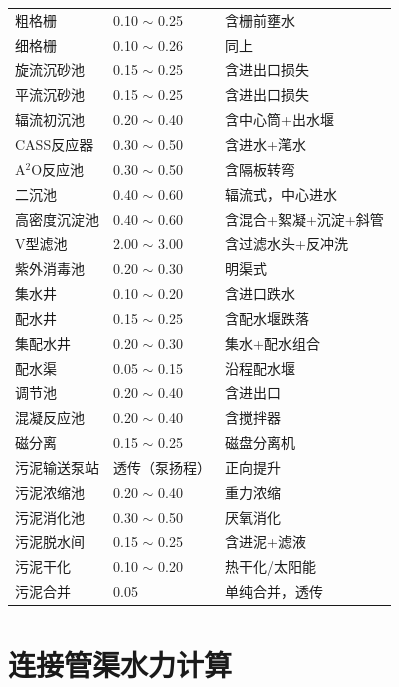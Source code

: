 \documentclass[12pt,a4paper]{ctexart}
\begin{document}
\begin{longtable}{@{}lll@{}}
粗格栅          & 0.10 $\sim$ 0.25  & 含栅前壅水 \\
细格栅          & 0.10 $\sim$ 0.26  & 同上 \\
旋流沉砂池      & 0.15 $\sim$ 0.25  & 含进出口损失 \\
平流沉砂池      & 0.15 $\sim$ 0.25  & 含进出口损失 \\
辐流初沉池      & 0.20 $\sim$ 0.40  & 含中心筒+出水堰 \\
CASS反应器      & 0.30 $\sim$ 0.50  & 含进水+滗水 \\
A$^2$O反应池    & 0.30 $\sim$ 0.50  & 含隔板转弯 \\
二沉池          & 0.40 $\sim$ 0.60  & 辐流式，中心进水 \\
高密度沉淀池    & 0.40 $\sim$ 0.60  & 含混合+絮凝+沉淀+斜管 \\
V型滤池         & 2.00 $\sim$ 3.00  & 含过滤水头+反冲洗 \\
紫外消毒池      & 0.20 $\sim$ 0.30  & 明渠式 \\
集水井          & 0.10 $\sim$ 0.20  & 含进口跌水 \\
配水井          & 0.15 $\sim$ 0.25  & 含配水堰跌落 \\
集配水井        & 0.20 $\sim$ 0.30  & 集水+配水组合 \\
配水渠          & 0.05 $\sim$ 0.15  & 沿程配水堰 \\
调节池          & 0.20 $\sim$ 0.40  & 含进出口 \\
混凝反应池      & 0.20 $\sim$ 0.40  & 含搅拌器 \\
磁分离          & 0.15 $\sim$ 0.25  & 磁盘分离机 \\
污泥输送泵站    & 透传（泵扬程）    & 正向提升 \\
污泥浓缩池      & 0.20 $\sim$ 0.40  & 重力浓缩 \\
污泥消化池      & 0.30 $\sim$ 0.50  & 厌氧消化 \\
污泥脱水间      & 0.15 $\sim$ 0.25  & 含进泥+滤液 \\
污泥干化        & 0.10 $\sim$ 0.20  & 热干化/太阳能 \\
污泥合并        & 0.05             & 单纯合并，透传 \\
\bottomrule
\end{longtable}

\section{连接管渠水力计算}
\end{document}
